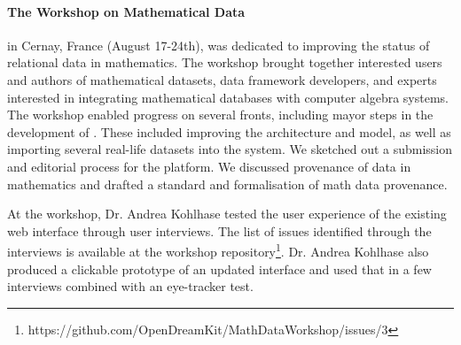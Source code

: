 \paragraph{The Workshop on Mathematical Data}
 in Cernay, France (August 17-24th),
was dedicated to improving the status of relational data in mathematics.
The workshop brought together interested users and authors of mathematical datasets, 
data framework developers, 
and experts interested in integrating mathematical databases with computer algebra systems.
The workshop enabled progress on several fronts,
including mayor steps in the development of \dmh.
These included improving the architecture and model, 
as well as importing several real-life datasets into the system.
We sketched out a submission and editorial process for the platform.
We discussed provenance of data in mathematics and
drafted a standard and formalisation of math data provenance.

At the workshop, Dr. Andrea Kohlhase tested the user experience 
of the existing web interface through user interviews.
The list of issues identified through the interviews is available at the 
workshop repository\footnote{https://github.com/OpenDreamKit/MathDataWorkshop/issues/3}.
Dr. Andrea Kohlhase also produced a clickable prototype of an updated interface
and used that in a few interviews combined with an eye-tracker test.





